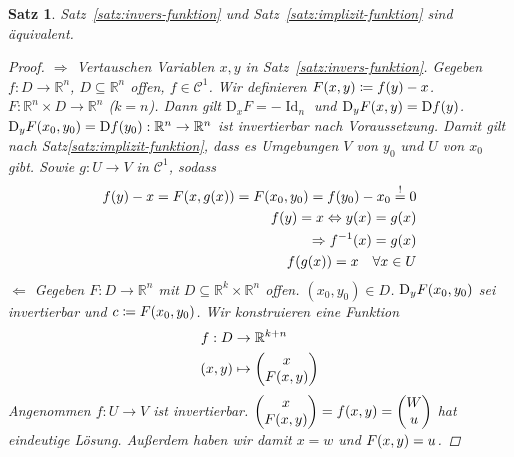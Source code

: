 \documentclass[11pt, twoside, a4paper]{article}
\theoremstyle{plain}
\newtheorem{satz}[blockelement]{Satz}
\numberwithin{equation}{subsection}
\newcommand{\pair}[1]{\left(#1\right)}
\newcommand{\of}[1]{\mathopen{}\mathclose{}\bgroup\left(#1\aftergroup\egroup\right)}
\newcommand{\equivalent}[0]{\Leftrightarrow{}}
\newcommand{\impl}[0]{\Rightarrow{}}
\newcommand{\fromto}{\rightarrow{}}
\newcommand{\annot}[3][]{\overset{\text{#3}}#1{#2}}
\newcommand{\anf}[1]{\glqq{}#1\grqq}
\DeclareMathOperator{\D}{D\!}
\DeclareMathOperator{\Id}{Id}
\newcommand{\R}{\mathbb{R}}
\newcommand{\mC}{\mathcal{C}}
\begin{document}
    \begin{satz} %
        Satz~\ref{satz:invers-funktion} und Satz~\ref{satz:implizit-funktion} sind äquivalent.
        \begin{proof}
            \anf{$\impl$} Vertauschen Variablen $x,y$ in Satz~\ref{satz:invers-funktion}. Gegeben $f: D\fromto\R^n$, $D\subseteq\R^n$ offen, $f\in\mC^{1}$. Wir definieren $F\of{x,y} \coloneqq f\of{y}-x$. $F:\R^n\times D\to\R^n$ ($k=n$). Dann gilt $\text{D}_x F = -\Id_{n}$ und $\text{D}_y F\of{x,y} = \D f\of{y}$.\\
            $\text{D}_y F\of{x_0, y_0} = \D f\of{y_0}: \R^n\fromto \R^n$ ist invertierbar nach Voraussetzung. Damit gilt nach Satz\ref{satz:implizit-funktion}, dass es Umgebungen $V$ von $y_0$ und $U$ von $x_0$ gibt. Sowie $g: U\to V$ in $\mC^1$, sodass
            \begin{align*}
                f\of{y} - x = F\of{x,g\of{x}} = F\of{x_0, y_0} = f\of{y_0} - x_0 \annot{=}{!} 0\\
                f\of{y} = x \equivalent y\of{x} = g\of{x}\\
                \impl f^{-1}\of{x} = g\of{x}\\
                f\of{g\of{x}} = x\quad\forall x\in U
            \end{align*}
            \anf{$\Leftarrow$} Gegeben $F: D\fromto\R^n$ mit $D\subseteq\R^k\times\R^n$ offen. $\pair{x_0, y_0}\in D$. $\text{D}_y F\of{x_0, y_0}$ sei invertierbar und $c\coloneqq F\of{x_0, y_0}$. Wir konstruieren eine Funktion
            \begin{align*}
                f: D&\to\R^{k+n}\\
                \pair{x,y}&\mapsto \begin{pmatrix}
                                       x\\
                                       F\of{x,y}
                \end{pmatrix}
            \end{align*}
            Angenommen $f: U\to V$ ist invertierbar. $\begin{pmatrix} x\\F\of{x,y} \end{pmatrix} = f\of{x,y} = \begin{pmatrix}
                                                                      W\\
                                                                      u
            \end{pmatrix}$ hat eindeutige Lösung. Außerdem haben wir damit $x=w$ und $F\of{x,y} = u$.

\end{proof}
\end{satz}
\end{document}
